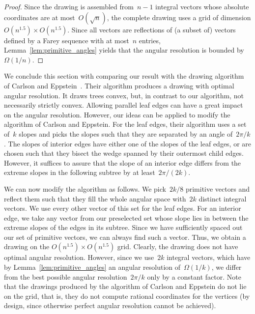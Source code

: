 \documentclass[a4paper,11pt]{article}
\theoremstyle{plain}
\begin{document}
\begin{proof}
  Since the drawing is assembled from~$n-1$ integral vectors whose absolute coordinates
  are at most~$O(\sqrt{n})$, the complete drawing uses a grid of dimension
  $O(n^{1.5})\times O(n^{1.5})$.
  Since all vectors are reflections of (a subset of) vectors defined by a Farey
  sequence with at most~$n$ entries, Lemma~\ref{lem:primitive_angles}
  yields that the angular resolution is bounded by~$\Omega(1/n)$. 
\end{proof}

We conclude this section with comparing our result with the drawing algorithm 
of Carlson and Eppstein~\cite{ce-tcfoa-GD06}. Their algorithm 
produces a drawing with optimal angular resolution. It draws trees 
convex, but, in contrast to our algorithm, not necessarily strictly
convex.  Allowing parallel leaf edges can have a great impact on the
angular resolution.  However, our ideas can be applied to modify the
algorithm of Carlson and Eppstein.  For the leaf edges, their algorithm uses  
a set of~$k$ slopes and picks the slopes such that they are separated by an 
angle of~$2\pi /k$. The slopes of interior edges have either one of the slopes
of the leaf edges, or are chosen such that they bisect the 
wedge spanned by their outermost child edges. However, it suffices to
assure that the slope of an interior edge differs from the 
extreme slopes in the following subtree by at least~$2 \pi / (2k)$. 

We can now modify the algorithm as follows.
We pick~$2k/8$ primitive vectors and reflect them such that
they fill the whole angular space with~$2k$ distinct integral vectors. 
We use every other vector of this set for the leaf edges.
For an interior edge, we take any vector from our preselected set 
whose slope lies in between the extreme slopes of the edges in its subtree. 
Since we have sufficiently spaced out our set of primitive vectors, we can 
always find such a vector. Thus, we obtain a drawing on the
$O(n^{1.5}) \times O(n^{1.5})$ grid. Clearly, the drawing does not have optimal 
angular resolution. However, since we use~$2k$ integral vectors, which have by 
Lemma~\ref{lem:primitive_angles} an angular resolution of~$\Omega(1/k)$,
we differ from the best possible angular resolution~$2\pi / k$ only by 
a constant factor.  Note that the drawings produced by the algorithm of 
Carlson and Eppstein do not lie on the grid, that is, they do not compute 
rational coordinates for the vertices (by design, since otherwise perfect 
angular resolution cannot be achieved).
\end{document}
